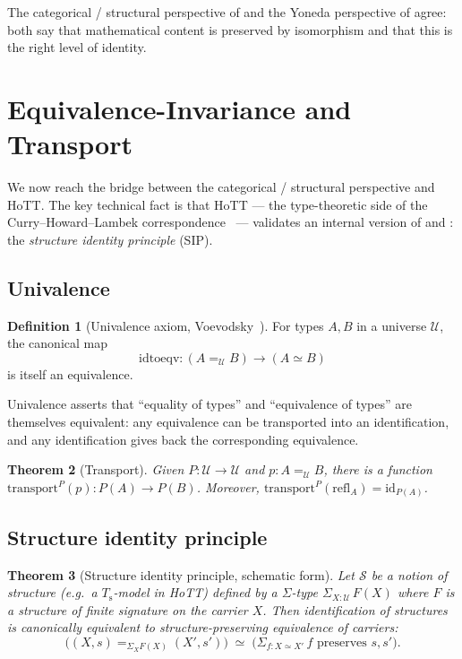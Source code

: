 \documentclass[12pt]{article}
\newtheorem{theorem}{Theorem}[section]
\theoremstyle{definition}
\newtheorem{definition}[theorem]{Definition}
\theoremstyle{remark}
\newcommand{\id}{\mathrm{id}}
\newcommand{\eq}{\simeq}
\newcommand{\succop}{\mathrm{s}}
\begin{document}
The categorical / structural perspective of  and the Yoneda perspective of  agree: both say that mathematical content is preserved by isomorphism and that this is the right level of identity.

\section{Equivalence-Invariance and Transport}\label{sec:transport}

We now reach the bridge between the categorical / structural perspective and HoTT. The key technical fact is that HoTT --- the type-theoretic side of the Curry--Howard--Lambek correspondence~\cite{Wadler2015} --- validates an internal version of  and : the \emph{structure identity principle} (SIP).

\subsection{Univalence}

\begin{definition}[Univalence axiom, Voevodsky~\cite{Voevodsky2010,HoTTBook}]
For types $A, B$ in a universe $\mathcal{U}$, the canonical map
\[
  \mathrm{idtoeqv} : (A =_{\mathcal{U}} B) \to (A \eq B)
\]
is itself an equivalence.
\end{definition}

Univalence asserts that ``equality of types'' and ``equivalence of types'' are themselves equivalent: any equivalence can be transported into an identification, and any identification gives back the corresponding equivalence.

\begin{theorem}[Transport]
Given $P : \mathcal{U} \to \mathcal{U}$ and $p : A =_\mathcal{U} B$, there is a function $\mathrm{transport}^P(p) : P(A) \to P(B)$. Moreover, $\mathrm{transport}^P(\mathrm{refl}_A) = \id_{P(A)}$.
\end{theorem}

\subsection{Structure identity principle}

\begin{theorem}[Structure identity principle, schematic form]\label{thm:sip}
Let $\mathcal{S}$ be a notion of structure (e.g.\ a $T_\succop$-model in HoTT) defined by a $\Sigma$-type $\Sigma_{X : \mathcal{U}}\, F(X)$ where $F$ is a structure of finite signature on the carrier $X$. Then identification of structures is canonically equivalent to structure-preserving equivalence of carriers:
\[
  \big( (X, s) =_{\Sigma_{X} F(X)} (X', s') \big) \;\eq\; \big(\Sigma_{f : X \eq X'}\, f \text{ preserves } s, s' \big).
\]
\end{theorem}
\end{document}
